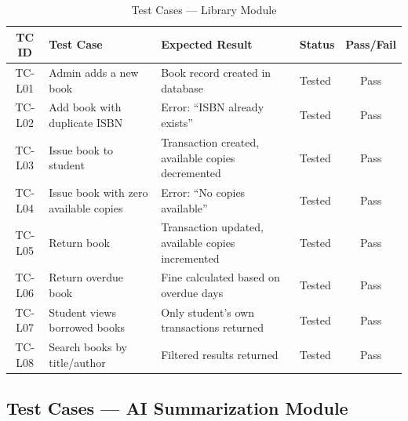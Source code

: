 \begin{table}[H]
\centering
\caption{Test Cases --- Library Module}
\label{tab:test_library}
\footnotesize
\begin{tabular}{|c|p{4cm}|p{4cm}|p{2cm}|c|}
\hline
\textbf{TC ID} & \textbf{Test Case} & \textbf{Expected Result} & \textbf{Status} & \textbf{Pass/Fail} \\
\hline
TC-L01 & Admin adds a new book & Book record created in database & Tested & Pass \\
\hline
TC-L02 & Add book with duplicate ISBN & Error: ``ISBN already exists'' & Tested & Pass \\
\hline
TC-L03 & Issue book to student & Transaction created, available copies decremented & Tested & Pass \\
\hline
TC-L04 & Issue book with zero available copies & Error: ``No copies available'' & Tested & Pass \\
\hline
TC-L05 & Return book & Transaction updated, available copies incremented & Tested & Pass \\
\hline
TC-L06 & Return overdue book & Fine calculated based on overdue days & Tested & Pass \\
\hline
TC-L07 & Student views borrowed books & Only student's own transactions returned & Tested & Pass \\
\hline
TC-L08 & Search books by title/author & Filtered results returned & Tested & Pass \\
\hline
\end{tabular}
\end{table}

\subsection{Test Cases --- AI Summarization Module}

